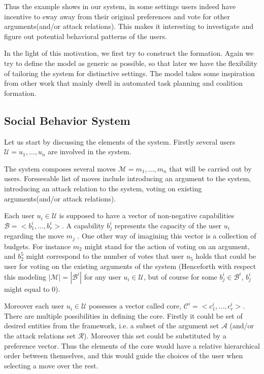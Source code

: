 \documentclass{article}
\begin{document}
{\color{red}   Thus the example shows in our system, in some settings users indeed have incentive to sway away from their original preferences and vote for other arguments(and/or attack relations).} This makes it interesting to investigate and figure out potential behavioral patterns of the users.

In the light of this motivation, we first try to construct  the formation. Again we try to define the model as generic as possible, so that later we have the flexibility of tailoring the system for distinctive settings. The model takes some inspiration from other work that mainly dwell in automated task planning and coalition formation.%

\subsection{Social Behavior System}
Let us start by discussing the elements of the system. Firstly several users $\mathcal{U} = {u_1, ..., u_n}$ are involved in the system. 

The system composes several moves  $\mathcal{M} = {m_1, ..., m_n}$ that will be carried out by users. Foreseeable list of moves include  introducing an argument to the system, introducing an attack relation to the system, voting on existing arguments(and/or attack relations).

Each user $u_i \in \mathcal{U}$ is supposed to have a vector of non-negative capabilities $\mathcal{B} = <b_1^i, ..., b_r^i>$. A capability $b_j^i$ represents the capacity of the user $u_i$ regarding the move $m_j$ .  One other way of imagining this vector is a collection of budgets. For instance $m_2$ might stand for the action of voting on an argument, and $b_2^5$ might correspond to the number of votes that user $u_5$ holds that could be user for voting on the existing arguments of the system (Henceforth with respect this modeling $|\mathcal{M}| = |\mathcal{B}^i|$ for any user $u_i \in \mathcal{U}$, but of course for some $b_j^i \in \mathcal{B}^i$, $b_j^i$ might equal to $0$).


Moreover each user $u_i \in \mathcal{U}$ possesses a vector called core, $\mathcal{C}^i = <c_1^i, ..., c_r^i>$. There are multiple possibilities in defining the core. Firstly it could be set of desired entities from the framework, i.e. a subset of the argument set $\mathcal{A}$ (and/or the attack relations set  $\mathcal{R}$). Moreover this set could be substituted by a preference vector. Thus the elements of the core would have a relative hierarchical order between themselves, and this would guide the choices of the user when selecting a move over the rest. 
\end{document}
